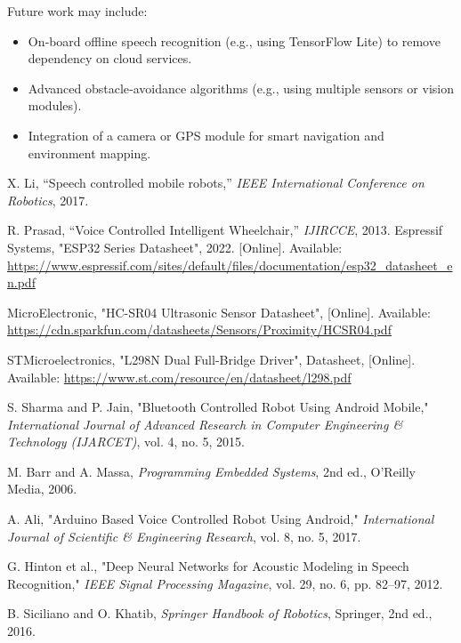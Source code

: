 \documentclass[conference]{IEEEtran}
\begin{document}
Future work may include:
\begin{itemize}
    \item On‑board offline speech recognition (e.g., using TensorFlow Lite) to remove dependency on cloud services.
    \item Advanced obstacle‑avoidance algorithms (e.g., using multiple sensors or vision modules).
    \item Integration of a camera or GPS module for smart navigation and environment mapping.
\end{itemize}

\begin{thebibliography}{1}
X. Li, “Speech controlled mobile robots,” \textit{IEEE International Conference on Robotics}, 2017.

R. Prasad, “Voice Controlled Intelligent Wheelchair,” \textit{IJIRCCE}, 2013.
Espressif Systems, "ESP32 Series Datasheet", 2022. [Online]. Available: \url{https://www.espressif.com/sites/default/files/documentation/esp32_datasheet_en.pdf}

MicroElectronic, "HC-SR04 Ultrasonic Sensor Datasheet", [Online]. Available: \url{https://cdn.sparkfun.com/datasheets/Sensors/Proximity/HCSR04.pdf}

STMicroelectronics, "L298N Dual Full-Bridge Driver", Datasheet, [Online]. Available: \url{https://www.st.com/resource/en/datasheet/l298.pdf}

S. Sharma and P. Jain, "Bluetooth Controlled Robot Using Android Mobile," \textit{International Journal of Advanced Research in Computer Engineering \& Technology (IJARCET)}, vol. 4, no. 5, 2015.

M. Barr and A. Massa, \textit{Programming Embedded Systems}, 2nd ed., O’Reilly Media, 2006.

A. Ali, "Arduino Based Voice Controlled Robot Using Android," \textit{International Journal of Scientific \& Engineering Research}, vol. 8, no. 5, 2017.

G. Hinton et al., "Deep Neural Networks for Acoustic Modeling in Speech Recognition," \textit{IEEE Signal Processing Magazine}, vol. 29, no. 6, pp. 82–97, 2012.

B. Siciliano and O. Khatib, \textit{Springer Handbook of Robotics}, Springer, 2nd ed., 2016.
\end{thebibliography}
\end{document}
